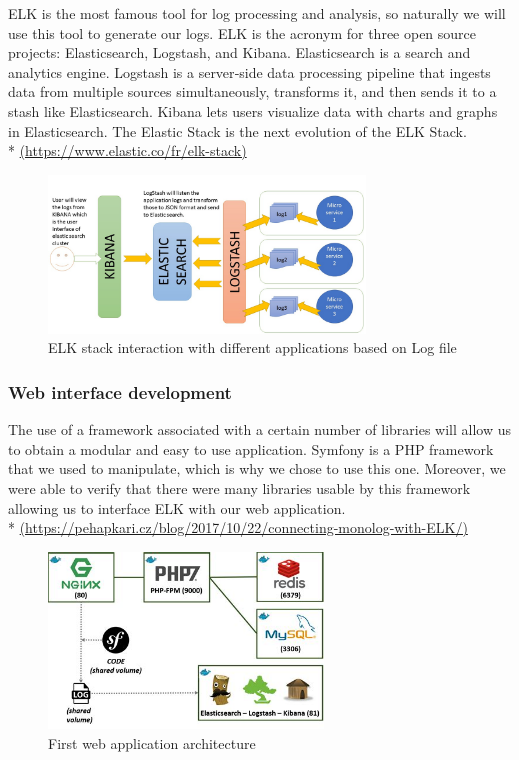 ELK is the most famous tool for log processing and analysis, so naturally we will use this tool to generate our logs.
ELK is the acronym for three open source projects:
Elasticsearch, Logstash, and Kibana. Elasticsearch is a search and
analytics engine. Logstash is a server‑side data processing pipeline
that ingests data from multiple sources simultaneously, transforms it,
and then sends it to a stash like Elasticsearch. Kibana lets
users visualize data with charts and graphs in Elasticsearch. The
Elastic Stack is the next evolution of the ELK Stack.\\ *
\url{(https://www.elastic.co/fr/elk-stack)}\\


\begin{figure}[!h]
  \centering
  \includegraphics[width=0.75\textwidth]{images/elk-example.png}
  \caption{ELK stack interaction with different applications based on Log file}
  \label{ELK}
\end{figure}

\subsubsection{Web interface development}

The use of a framework associated with a certain number of libraries will
allow us to obtain a modular and easy to use application.
Symfony is a PHP framework that we used to manipulate, which is why we chose
to use this one. Moreover, we were able to verify that there were many
libraries usable by this framework allowing us to interface ELK with our web
application. \\ *
\url{(https://pehapkari.cz/blog/2017/10/22/connecting-monolog-with-ELK/)}\\

\begin{figure}[!h]
  \centering
  \includegraphics[width=0.65\textwidth]{images/symfony-example.jpg}
  \caption{First web application architecture}
  \label{Symfony}
\end{figure}

